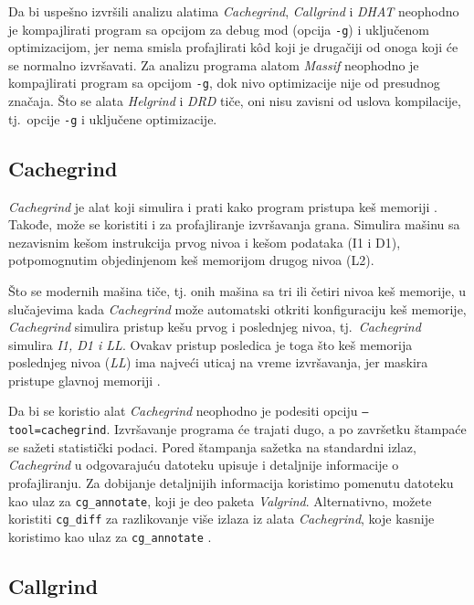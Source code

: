 \documentclass[12pt,oneside]{memoir}
\theoremstyle{plain}
\theoremstyle{definition}
\begin{document}
Da bi uspešno izvršili analizu alatima \textit{Cachegrind}, \textit{Callgrind} i \textit{DHAT} neophodno je kompajlirati program sa opcijom za debug mod (opcija \texttt{-g}) i uključenom optimizacijom, jer nema smisla profajlirati k\^od koji je drugačiji od onoga koji će se normalno izvršavati. Za analizu programa alatom \textit{Massif} neophodno je kompajlirati program sa opcijom \texttt{-g}, dok nivo optimizacije nije od presudnog značaja. Što se alata \textit{Helgrind} i \textit{DRD} tiče, oni nisu zavisni od uslova kompilacije, tj.~opcije \texttt{-g} i uključene optimizacije.

\subsection{Cachegrind}
\textit{Cachegrind} je alat koji simulira i prati kako program pristupa keš memoriji \cite{Cachegrind}. Takođe, može se koristiti i za profajliranje izvršavanja grana. Simulira mašinu sa nezavisnim kešom instrukcija prvog nivoa i kešom podataka (I1 i D1), potpomognutim objedinjenom keš memorijom drugog nivoa (L2). 

Što se modernih mašina tiče, tj. onih mašina sa tri ili četiri nivoa keš memorije, u slučajevima kada \textit{Cachegrind} može automatski otkriti konfiguraciju keš memorije, \textit{Cachegrind} simulira pristup kešu prvog i poslednjeg nivoa, tj.~\textit{Cachegrind} simulira \textit{I1, D1 i LL}. Ovakav pristup posledica je toga što keš memorija poslednjeg nivoa (\textit{LL}) ima najveći uticaj na vreme izvršavanja, jer maskira pristupe glavnoj memoriji \cite{Cachegrind}.%

Da bi se koristio alat \textit{Cachegrind} neophodno je podesiti opciju \texttt{–tool=cachegrind}. Izvršavanje programa će trajati dugo, a po završetku štampaće se sažeti statistički podaci. Pored štampanja sažetka na standardni izlaz, \textit{Cachegrind} u odgovarajuću datoteku upisuje i detaljnije informacije o profajliranju. Za dobijanje detaljnijih informacija koristimo pomenutu datoteku kao ulaz za \texttt{cg\_annotate}, koji je deo paketa \textit{Valgrind}. Alternativno, možete koristiti \texttt{cg\_diff} za razlikovanje više izlaza iz alata \textit{Cachegrind}, koje kasnije koristimo kao ulaz za \texttt{cg\_annotate} \cite{Cachegrind}.

\subsection{Callgrind}
\end{document}
